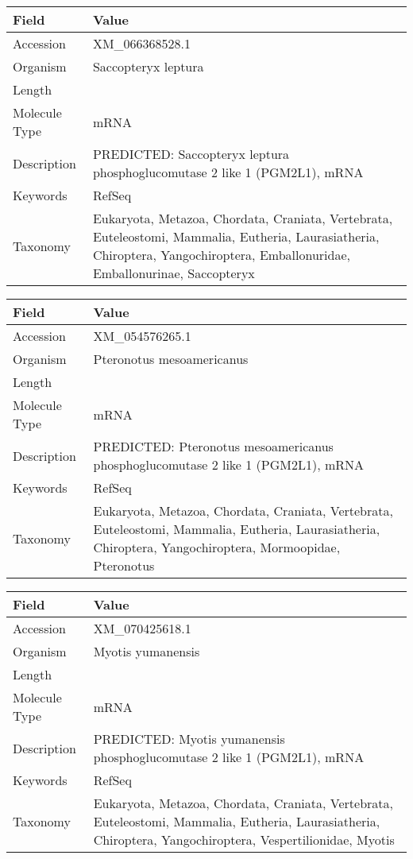 \documentclass[10pt]{article}
\begin{document}
{\footnotesize
\begin{longtable}{>{\raggedright\arraybackslash}p{4.5cm} >{\raggedright\arraybackslash}p{11.5cm}}
\textbf{Field} & \textbf{Value} \\
\hline
Accession & XM\_066368528.1 \\
Organism & Saccopteryx leptura \\
Length & 7222 \\
Molecule Type & mRNA \\
Description & PREDICTED: Saccopteryx leptura phosphoglucomutase 2 like 1 (PGM2L1), mRNA \\
Keywords & RefSeq \\
Taxonomy & Eukaryota, Metazoa, Chordata, Craniata, Vertebrata, Euteleostomi, Mammalia, Eutheria, Laurasiatheria, Chiroptera, Yangochiroptera, Emballonuridae, Emballonurinae, Saccopteryx \\
\end{longtable}
}

{\footnotesize
\begin{longtable}{>{\raggedright\arraybackslash}p{4.5cm} >{\raggedright\arraybackslash}p{11.5cm}}
\textbf{Field} & \textbf{Value} \\
\hline
Accession & XM\_054576265.1 \\
Organism & Pteronotus mesoamericanus \\
Length & 7824 \\
Molecule Type & mRNA \\
Description & PREDICTED: Pteronotus mesoamericanus phosphoglucomutase 2 like 1 (PGM2L1), mRNA \\
Keywords & RefSeq \\
Taxonomy & Eukaryota, Metazoa, Chordata, Craniata, Vertebrata, Euteleostomi, Mammalia, Eutheria, Laurasiatheria, Chiroptera, Yangochiroptera, Mormoopidae, Pteronotus \\
\end{longtable}
}

{\footnotesize
\begin{longtable}{>{\raggedright\arraybackslash}p{4.5cm} >{\raggedright\arraybackslash}p{11.5cm}}
\textbf{Field} & \textbf{Value} \\
\hline
Accession & XM\_070425618.1 \\
Organism & Myotis yumanensis \\
Length & 7638 \\
Molecule Type & mRNA \\
Description & PREDICTED: Myotis yumanensis phosphoglucomutase 2 like 1 (PGM2L1), mRNA \\
Keywords & RefSeq \\
Taxonomy & Eukaryota, Metazoa, Chordata, Craniata, Vertebrata, Euteleostomi, Mammalia, Eutheria, Laurasiatheria, Chiroptera, Yangochiroptera, Vespertilionidae, Myotis \\
\end{longtable}
}
\end{document}
